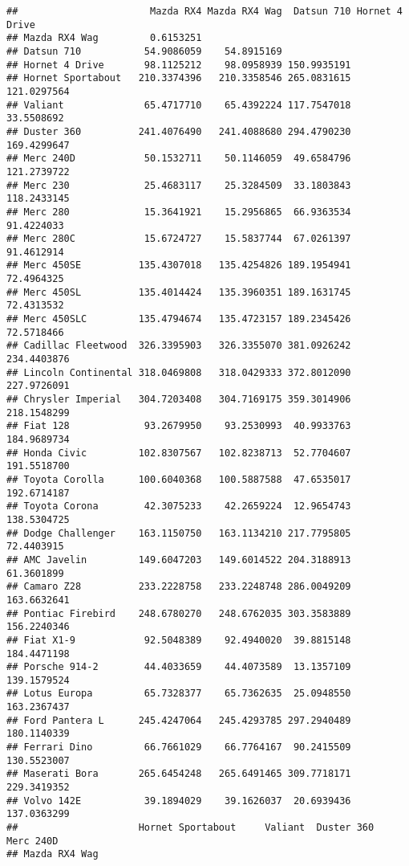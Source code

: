 \documentclass[]{book}
\begin{document}
\begin{verbatim}
##                       Mazda RX4 Mazda RX4 Wag  Datsun 710 Hornet 4 Drive
## Mazda RX4 Wag         0.6153251                                         
## Datsun 710           54.9086059    54.8915169                           
## Hornet 4 Drive       98.1125212    98.0958939 150.9935191               
## Hornet Sportabout   210.3374396   210.3358546 265.0831615    121.0297564
## Valiant              65.4717710    65.4392224 117.7547018     33.5508692
## Duster 360          241.4076490   241.4088680 294.4790230    169.4299647
## Merc 240D            50.1532711    50.1146059  49.6584796    121.2739722
## Merc 230             25.4683117    25.3284509  33.1803843    118.2433145
## Merc 280             15.3641921    15.2956865  66.9363534     91.4224033
## Merc 280C            15.6724727    15.5837744  67.0261397     91.4612914
## Merc 450SE          135.4307018   135.4254826 189.1954941     72.4964325
## Merc 450SL          135.4014424   135.3960351 189.1631745     72.4313532
## Merc 450SLC         135.4794674   135.4723157 189.2345426     72.5718466
## Cadillac Fleetwood  326.3395903   326.3355070 381.0926242    234.4403876
## Lincoln Continental 318.0469808   318.0429333 372.8012090    227.9726091
## Chrysler Imperial   304.7203408   304.7169175 359.3014906    218.1548299
## Fiat 128             93.2679950    93.2530993  40.9933763    184.9689734
## Honda Civic         102.8307567   102.8238713  52.7704607    191.5518700
## Toyota Corolla      100.6040368   100.5887588  47.6535017    192.6714187
## Toyota Corona        42.3075233    42.2659224  12.9654743    138.5304725
## Dodge Challenger    163.1150750   163.1134210 217.7795805     72.4403915
## AMC Javelin         149.6047203   149.6014522 204.3188913     61.3601899
## Camaro Z28          233.2228758   233.2248748 286.0049209    163.6632641
## Pontiac Firebird    248.6780270   248.6762035 303.3583889    156.2240346
## Fiat X1-9            92.5048389    92.4940020  39.8815148    184.4471198
## Porsche 914-2        44.4033659    44.4073589  13.1357109    139.1579524
## Lotus Europa         65.7328377    65.7362635  25.0948550    163.2367437
## Ford Pantera L      245.4247064   245.4293785 297.2940489    180.1140339
## Ferrari Dino         66.7661029    66.7764167  90.2415509    130.5523007
## Maserati Bora       265.6454248   265.6491465 309.7718171    229.3419352
## Volvo 142E           39.1894029    39.1626037  20.6939436    137.0363299
##                     Hornet Sportabout     Valiant  Duster 360   Merc 240D
## Mazda RX4 Wag                                                            

\end{verbatim}
\end{document}
